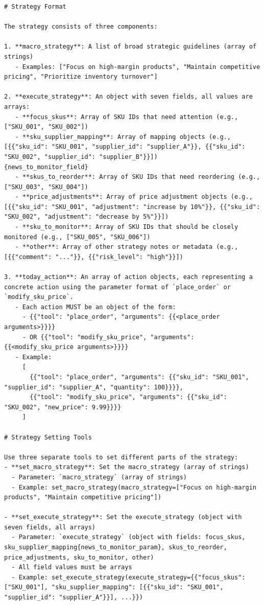 \begin{Verbatim}[breaklines=true, breakanywhere=true]
# Strategy Format

The strategy consists of three components:

1. **macro_strategy**: A list of broad strategic guidelines (array of strings)
   - Examples: ["Focus on high-margin products", "Maintain competitive pricing", "Prioritize inventory turnover"]

2. **execute_strategy**: An object with seven fields, all values are arrays:
   - **focus_skus**: Array of SKU IDs that need attention (e.g., ["SKU_001", "SKU_002"])
   - **sku_supplier_mapping**: Array of mapping objects (e.g., [{{"sku_id": "SKU_001", "supplier_id": "supplier_A"}}, {{"sku_id": "SKU_002", "supplier_id": "supplier_B"}}])
{news_to_monitor_field}
   - **skus_to_reorder**: Array of SKU IDs that need reordering (e.g., ["SKU_003", "SKU_004"])
   - **price_adjustments**: Array of price adjustment objects (e.g., [{{"sku_id": "SKU_001", "adjustment": "increase by 10%"}}, {{"sku_id": "SKU_002", "adjustment": "decrease by 5%"}}])
   - **sku_to_monitor**: Array of SKU IDs that should be closely monitored (e.g., ["SKU_005", "SKU_006"])
   - **other**: Array of other strategy notes or metadata (e.g., [{{"comment": "..."}}, {{"risk_level": "high"}}])

3. **today_action**: An array of action objects, each representing a concrete action using the parameter format of `place_order` or `modify_sku_price`.
   - Each action MUST be an object of the form:
     - {{"tool": "place_order", "arguments": {{<place_order arguments>}}}}
     - OR {{"tool": "modify_sku_price", "arguments": {{<modify_sku_price arguments>}}}}
   - Example:
     [
       {{"tool": "place_order", "arguments": {{"sku_id": "SKU_001", "supplier_id": "supplier_A", "quantity": 100}}}},
       {{"tool": "modify_sku_price", "arguments": {{"sku_id": "SKU_002", "new_price": 9.99}}}}
     ]

# Strategy Setting Tools

Use three separate tools to set different parts of the strategy:
- **set_macro_strategy**: Set the macro_strategy (array of strings)
  - Parameter: `macro_strategy` (array of strings)
  - Example: set_macro_strategy(macro_strategy=["Focus on high-margin products", "Maintain competitive pricing"])

- **set_execute_strategy**: Set the execute_strategy (object with seven fields, all arrays)
  - Parameter: `execute_strategy` (object with fields: focus_skus, sku_supplier_mapping{news_to_monitor_param}, skus_to_reorder, price_adjustments, sku_to_monitor, other)
  - All field values must be arrays
  - Example: set_execute_strategy(execute_strategy={{"focus_skus": ["SKU_001"], "sku_supplier_mapping": [{{"sku_id": "SKU_001", "supplier_id": "supplier_A"}}], ...}})


\end{Verbatim}
